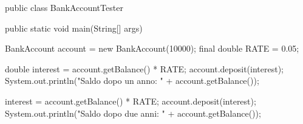 \begin{unipdcode}[language=Java]
public class BankAccountTester {
    public static void main(String[] args) {
        BankAccount account = new BankAccount(10000);
        final double RATE = 0.05;

        double interest = account.getBalance() * RATE;
        account.deposit(interest);
        System.out.println("Saldo dopo un anno: " + account.getBalance());

        interest = account.getBalance() * RATE;
        account.deposit(interest);
        System.out.println("Saldo dopo due anni: " + account.getBalance());
    }
}
\end{unipdcode}

